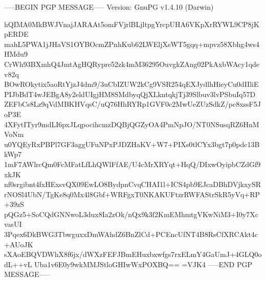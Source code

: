 -----BEGIN PGP MESSAGE-----
Version: GnuPG v1.4.10 (Darwin)

hQIMA0MkBWJVnajJARAAt5omFVjrlBLjltpgYrcpUHA6VKpXrRYWL9CP8jKpERDE
mahL5PWA1jJHaVS1OYBOcmZPnhKub62LWEljXsWT5gqq+mpvz58Xbhg4ws4HMdu9
CrWh93BXmhQ4JmtAgHQRypre52zk4mM36295OuvgkZAng02PkAxbWAcy1qdev82q
BOwROkytix5aoRtYjzJ4dm9/3uCbIZUW2kCg9VSR254qEXJydlhHieyCu0dIIliE
PIJbBdT4wJEBgA8y2eldUIgjHM8SMdbyqQjXLkntqkjTj39Slbuv3lvPSbuIq57D
ZEFbCs8Lz9qVdMBKHVqsC/uQ76HhRYRp1GVF0c2MwUeZUzSdkZ/pc8xssF5JoP3E
4XFytITyr9mdLI6pxJLqpocihcmzDQBjQGZyOA4PmNpJO/NT0NSusqRZ6HnMVoNm
u0YQEyRxPBPl7GF3aggUFuNPxPJDZHaKV+W7+PIXs0tlCYx3bgt7p0pdc13BkWp7
1mF7AWlrcQm0FcMFatLfLhQWlFfAE/U4cMrXRYqt+HqQ/DIxwOyipbCZdGf9xkJK
nf0srgibnt4fxHExsvQX09EwLO8BydpnCvqCHAI1l+ICS4pb9EJcaDBhDVjkxySR
rNOSl4UbN/TgKe8q0Mx4l8Gbf+WRFgxT0NKAKUFtzrRWFAStrSkR5yVq+RP+39zS
pQGz5+SoCQdGNNwoL3dux8Ia2zOk/nQx9k3f2KmEMhmtgVKwNiM3+I0y7XcvasUI
3Pqex6DkBWG3TbwguxxDmWAhdZ6BnZlCd+PCEncUfNT4B8RsCfXRCAkt4c+AUoJK
sXAoEBQVDWhX8f6jx/dWXzFEFJBmEHuxbxwfgs7rxELmY4GaUmJ+4GLQ0odL++vL
Uba1v6E0y9wkMMJStloGHIwWxPOXBQ==
=VJK4
-----END PGP MESSAGE-----
